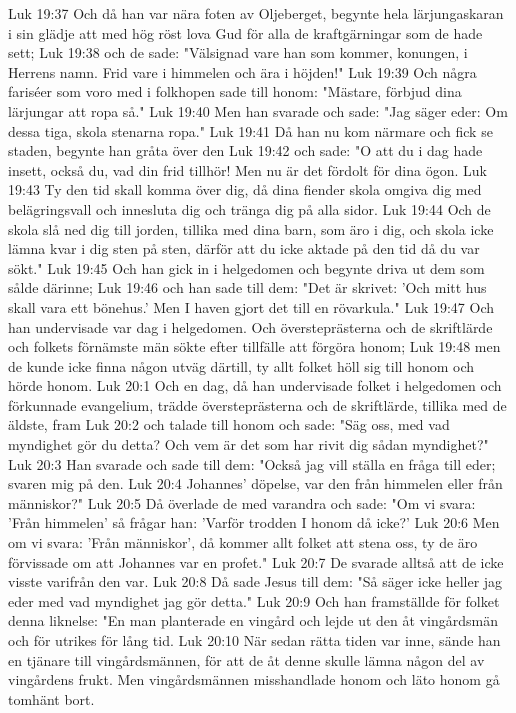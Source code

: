 Luk 19:37  Och då han var nära foten av Oljeberget, begynte hela lärjungaskaran i sin glädje att med hög röst lova Gud för alla de kraftgärningar som de hade sett;
Luk 19:38  och de sade: "Välsignad vare han som kommer, konungen, i Herrens namn. Frid vare i himmelen och ära i höjden!"
Luk 19:39  Och några fariséer som voro med i folkhopen sade till honom: "Mästare, förbjud dina lärjungar att ropa så."
Luk 19:40  Men han svarade och sade: "Jag säger eder: Om dessa tiga, skola stenarna ropa."
Luk 19:41  Då han nu kom närmare och fick se staden, begynte han gråta över den
Luk 19:42  och sade: "O att du i dag hade insett, också du, vad din frid tillhör! Men nu är det fördolt för dina ögon.
Luk 19:43  Ty den tid skall komma över dig, då dina fiender skola omgiva dig med belägringsvall och innesluta dig och tränga dig på alla sidor.
Luk 19:44  Och de skola slå ned dig till jorden, tillika med dina barn, som äro i dig, och skola icke lämna kvar i dig sten på sten, därför att du icke aktade på den tid då du var sökt."
Luk 19:45  Och han gick in i helgedomen och begynte driva ut dem som sålde därinne;
Luk 19:46  och han sade till dem: "Det är skrivet: 'Och mitt hus skall vara ett bönehus.' Men I haven gjort det till en rövarkula."
Luk 19:47  Och han undervisade var dag i helgedomen. Och översteprästerna och de skriftlärde och folkets förnämste män sökte efter tillfälle att förgöra honom;
Luk 19:48  men de kunde icke finna någon utväg därtill, ty allt folket höll sig till honom och hörde honom.
Luk 20:1  Och en dag, då han undervisade folket i helgedomen och förkunnade evangelium, trädde översteprästerna och de skriftlärde, tillika med de äldste, fram
Luk 20:2  och talade till honom och sade: "Säg oss, med vad myndighet gör du detta? Och vem är det som har rivit dig sådan myndighet?"
Luk 20:3  Han svarade och sade till dem: "Också jag vill ställa en fråga till eder; svaren mig på den.
Luk 20:4  Johannes' döpelse, var den från himmelen eller från människor?"
Luk 20:5  Då överlade de med varandra och sade: "Om vi svara: 'Från himmelen' så frågar han: 'Varför trodden I honom då icke?'
Luk 20:6  Men om vi svara: 'Från människor', då kommer allt folket att stena oss, ty de äro förvissade om att Johannes var en profet."
Luk 20:7  De svarade alltså att de icke visste varifrån den var.
Luk 20:8  Då sade Jesus till dem: "Så säger icke heller jag eder med vad myndighet jag gör detta."
Luk 20:9  Och han framställde för folket denna liknelse: "En man planterade en vingård och lejde ut den åt vingårdsmän och för utrikes för lång tid.
Luk 20:10  När sedan rätta tiden var inne, sände han en tjänare till vingårdsmännen, för att de åt denne skulle lämna någon del av vingårdens frukt. Men vingårdsmännen misshandlade honom och läto honom gå tomhänt bort.
